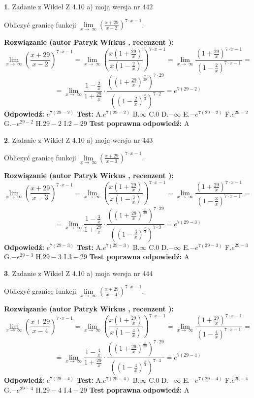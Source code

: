 \documentclass[12pt, a4paper]{article}
\theoremstyle{definition} %
\newtheorem{zad}{}
\newcommand{\zadStart}[1]{\begin{zad}#1\newline}
\newcommand{\zadStop}{\end{zad}}
\newcommand{\rozwStart}[2]{\noindent \textbf{Rozwiązanie (autor #1 , recenzent #2): }\newline}
\newcommand{\rozwStop}{\newline}
\newcommand{\odpStart}{\noindent \textbf{Odpowiedź:}\newline}
\newcommand{\odpStop}{\newline}
\newcommand{\testStart}{\noindent \textbf{Test:}\newline}
\newcommand{\testStop}{\newline}
\newcommand{\kluczStart}{\noindent \textbf{Test poprawna odpowiedź:}\newline}
\newcommand{\kluczStop}{\newline}
\begin{document}
\zadStart{Zadanie z Wikieł Z 4.10 a) moja wersja nr 442}


Obliczyć granicę funkcji  $\lim\limits_{x\to\ \infty}(\frac{x+29}{x-2})^{7\cdot x-1}$.
\zadStop
\rozwStart{Patryk Wirkus}{}
$$\lim\limits_{x\to\ \infty}(\frac{x+29}{x-2})^{7\cdot x-1} = \lim\limits_{x\to\ \infty}(\frac{x(1+\frac{29}{x})}{x(1-\frac{2}{x})})^{7\cdot x-1}=\lim\limits_{x\to\ \infty}\frac{(1+\frac{29}{x})^{7\cdot x-1}}{(1-\frac{2}{x})^{7\cdot x-1}}=$$
$$=\lim\limits_{x\to\ \infty}\frac{1-\frac{2}{x}}{1+\frac{29}{x}}\cdot\frac{((1+\frac{29}{x})^{\frac{x}{29}})^{7\cdot29}}{((1-\frac{2}{x})^{\frac{x}{2}})^{7\cdot2}}=e^{7(29-2)}$$
\rozwStop
\odpStart
$e^{7(29-2)}$
\odpStop
\testStart
A.$e^{7(29-2)}$ B.$\infty$ C.$0$ D.$-\infty$ E.$-e^{7(29-2)}$
F.$e^{29-2}$ G.$-e^{29-2}$
H.$29-2$
I.$2-29$
\testStop
\kluczStart
A
\kluczStop



\zadStart{Zadanie z Wikieł Z 4.10 a) moja wersja nr 443}


Obliczyć granicę funkcji  $\lim\limits_{x\to\ \infty}(\frac{x+29}{x-3})^{7\cdot x-1}$.
\zadStop
\rozwStart{Patryk Wirkus}{}
$$\lim\limits_{x\to\ \infty}(\frac{x+29}{x-3})^{7\cdot x-1} = \lim\limits_{x\to\ \infty}(\frac{x(1+\frac{29}{x})}{x(1-\frac{3}{x})})^{7\cdot x-1}=\lim\limits_{x\to\ \infty}\frac{(1+\frac{29}{x})^{7\cdot x-1}}{(1-\frac{3}{x})^{7\cdot x-1}}=$$
$$=\lim\limits_{x\to\ \infty}\frac{1-\frac{3}{x}}{1+\frac{29}{x}}\cdot\frac{((1+\frac{29}{x})^{\frac{x}{29}})^{7\cdot29}}{((1-\frac{3}{x})^{\frac{x}{3}})^{7\cdot3}}=e^{7(29-3)}$$
\rozwStop
\odpStart
$e^{7(29-3)}$
\odpStop
\testStart
A.$e^{7(29-3)}$ B.$\infty$ C.$0$ D.$-\infty$ E.$-e^{7(29-3)}$
F.$e^{29-3}$ G.$-e^{29-3}$
H.$29-3$
I.$3-29$
\testStop
\kluczStart
A
\kluczStop



\zadStart{Zadanie z Wikieł Z 4.10 a) moja wersja nr 444}


Obliczyć granicę funkcji  $\lim\limits_{x\to\ \infty}(\frac{x+29}{x-4})^{7\cdot x-1}$.
\zadStop
\rozwStart{Patryk Wirkus}{}
$$\lim\limits_{x\to\ \infty}(\frac{x+29}{x-4})^{7\cdot x-1} = \lim\limits_{x\to\ \infty}(\frac{x(1+\frac{29}{x})}{x(1-\frac{4}{x})})^{7\cdot x-1}=\lim\limits_{x\to\ \infty}\frac{(1+\frac{29}{x})^{7\cdot x-1}}{(1-\frac{4}{x})^{7\cdot x-1}}=$$
$$=\lim\limits_{x\to\ \infty}\frac{1-\frac{4}{x}}{1+\frac{29}{x}}\cdot\frac{((1+\frac{29}{x})^{\frac{x}{29}})^{7\cdot29}}{((1-\frac{4}{x})^{\frac{x}{4}})^{7\cdot4}}=e^{7(29-4)}$$
\rozwStop
\odpStart
$e^{7(29-4)}$
\odpStop
\testStart
A.$e^{7(29-4)}$ B.$\infty$ C.$0$ D.$-\infty$ E.$-e^{7(29-4)}$
F.$e^{29-4}$ G.$-e^{29-4}$
H.$29-4$
I.$4-29$
\testStop
\kluczStart
A
\kluczStop
\end{document}

